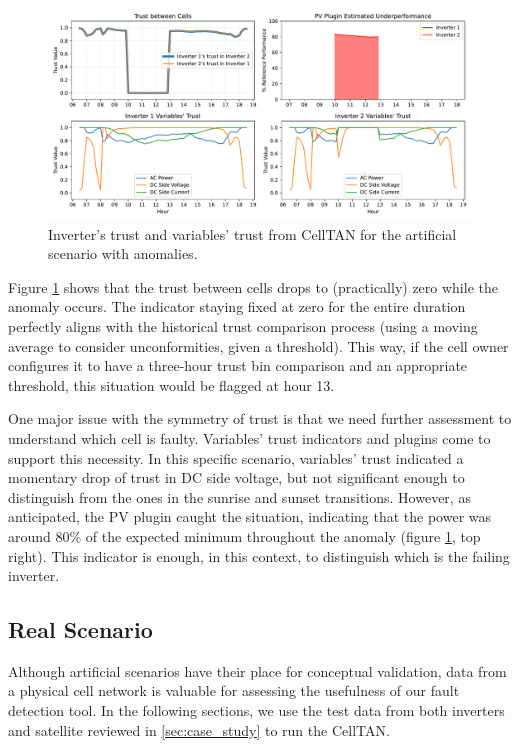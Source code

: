 \begin{figure}[h!]
    \centering
    \includegraphics[width=\textwidth]{figures/chapter5/results/artificial/43_results_test_clone_02.pdf}
    \caption{Inverter's trust and variables' trust from CellTAN for the artificial scenario with anomalies.}
    \label{fig:artificial_results_02}
\end{figure}

Figure \ref{fig:artificial_results_02} shows that the trust between cells drops to (practically) zero while the anomaly occurs. The indicator staying fixed at zero for the entire duration perfectly aligns with the historical trust comparison process (using a moving average to consider unconformities, given a threshold). This way, if the cell owner configures it to have a three-hour trust bin comparison and an appropriate threshold, this situation would be flagged at hour 13.

One major issue with the symmetry of trust is that we need further assessment to understand which cell is faulty. Variables' trust indicators and plugins come to support this necessity. In this specific scenario, variables' trust indicated a momentary drop of trust in DC side voltage, but not significant enough to distinguish from the ones in the sunrise and sunset transitions. However, as anticipated, the PV plugin caught the situation, indicating that the power was around 80\% of the expected minimum throughout the anomaly (figure \ref{fig:artificial_results_02}, top right). This indicator is enough, in this context, to distinguish which is the failing inverter.

\subsection{Real Scenario}

Although artificial scenarios have their place for conceptual validation, data from a physical cell network is valuable for assessing the usefulness of our fault detection tool. In the following sections, we use the test data from both inverters and satellite reviewed in \ref{sec:case_study} to run the CellTAN.


